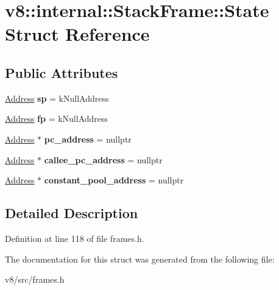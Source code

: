 \hypertarget{structv8_1_1internal_1_1StackFrame_1_1State}{}\section{v8\+:\+:internal\+:\+:Stack\+Frame\+:\+:State Struct Reference}
\label{structv8_1_1internal_1_1StackFrame_1_1State}
\subsection*{Public Attributes}
\begin{DoxyCompactItemize}
\item 
\mbox{\label{structv8_1_1internal_1_1StackFrame_1_1State_af89c57008316ddf857dac51f6e2284a6}} 
\mbox{\hyperlink{classuintptr__t}{Address}} {\bfseries sp} = k\+Null\+Address
\item 
\mbox{\label{structv8_1_1internal_1_1StackFrame_1_1State_a83fcf90755a707ce31414c4029a54e80}} 
\mbox{\hyperlink{classuintptr__t}{Address}} {\bfseries fp} = k\+Null\+Address
\item 
\mbox{\label{structv8_1_1internal_1_1StackFrame_1_1State_ae7d62748e9559dee5ecd800083be0aeb}} 
\mbox{\hyperlink{classuintptr__t}{Address}} $\ast$ {\bfseries pc\+\_\+address} = nullptr
\item 
\mbox{\label{structv8_1_1internal_1_1StackFrame_1_1State_a7af5b65162038b759d8490b3d5b49bfe}} 
\mbox{\hyperlink{classuintptr__t}{Address}} $\ast$ {\bfseries callee\+\_\+pc\+\_\+address} = nullptr
\item 
\mbox{\label{structv8_1_1internal_1_1StackFrame_1_1State_ac9de657c89f80a2d0e3e17f2f70fca31}} 
\mbox{\hyperlink{classuintptr__t}{Address}} $\ast$ {\bfseries constant\+\_\+pool\+\_\+address} = nullptr
\end{DoxyCompactItemize}


\subsection{Detailed Description}


Definition at line 118 of file frames.\+h.



The documentation for this struct was generated from the following file\+:\begin{DoxyCompactItemize}
\item 
v8/src/frames.\+h\end{DoxyCompactItemize}
